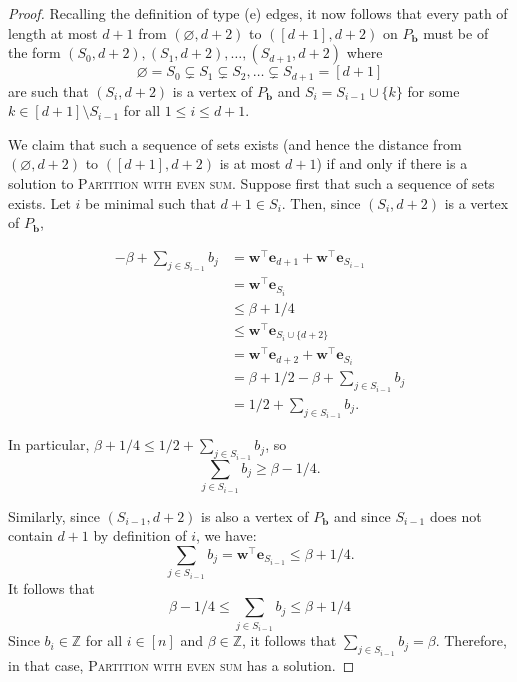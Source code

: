 \documentclass[10pt,a4paper]{amsart}
\renewcommand{\emptyset}{\varnothing}
\begin{document}
\begin{proof}
Recalling the definition of type (e) edges, it now follows that every path of length at most $d+1$ from $(\emptyset, d+2)$ to $([d+1], d+2)$ on $P_\mathbf{b}$ must be of the form $(S_0,d+2),(S_1,d+2),\ldots,(S_{d+1},d+2)$ where \[\emptyset = S_{0} \subsetneq  S_{1} \subsetneq S_{2}, \dots \subsetneq S_{d+1} = [d+1]\] are such that $(S_{i},d+2)$ is a vertex of $P_\mathbf{b}$ and $S_{i} = S_{i-1} \cup \{k\}$ for some $k \in [d+1] \setminus S_{i-1}$ for all $1\le i \le d+1$.

We claim that such a sequence of sets exists (and hence the distance from $(\emptyset,d+2)$ to $([d+1],d+2)$ is at most $d+1$) if and only if there is a solution to \textsc{Partition with even sum}. Suppose first that such a sequence of sets exists. Let $i$ be minimal such that $d+1 \in S_{i}$. Then, since $(S_{i}, d+2)$ is a vertex of $P_{\mathbf{b}}$,

\begin{align*}
 -\beta +\sum_{j \in S_{i-1}} b_{j} &= \mathbf{w}^{\intercal}\mathbf{e}_{d+1} + \mathbf{w}^{\intercal} \mathbf{e}_{S_{i-1}}\\
 &= \mathbf{w}^{\intercal} \mathbf{e}_{S_{i}} \\
 &\leq \beta + 1/4 \\
 &\leq \mathbf{w}^{\intercal}\mathbf{e}_{S_{i} \cup \{d+2\}} \\
 &= \mathbf{w}^{\intercal} \mathbf{e}_{d+2} + \mathbf{w}^{\intercal} \mathbf{e}_{S_{i}} \\
 &=  \beta + 1/2 - \beta + \sum_{j \in S_{i-1}} b_{j} \\
 &= 1/2 + \sum_{j \in S_{i-1}} b_{j}.      
\end{align*}

In particular, $\beta + 1/4 \leq 1/2 + \sum_{j \in S_{i-1}} b_{j}$, so
\[\sum_{j \in S_{i-1}} b_{j} \geq \beta -1/4.\]

Similarly, since $(S_{i-1},d+2)$ is also a vertex of $P_{\mathbf{b}}$ and since $S_{i-1}$ does not contain $d+1$ by definition of $i$, we have:
\[\sum_{j \in S_{i-1}}b_{j} = \mathbf{w}^{\intercal}\mathbf{e}_{S_{i-1}} \leq \beta + 1/4.\]
It follows that 
\[\beta - 1/4 \leq \sum_{j \in S_{i-1}} b_{j} \leq \beta + 1/4\]
Since $b_{i} \in \mathbb{Z}$ for all $i \in [n]$ and $\beta\in \mathbb{Z}$, it follows that $\sum_{j \in S_{i-1}} b_{j} = \beta$. Therefore, in that case, \textsc{Partition with even sum} has a solution.


\end{proof}
\end{document}
